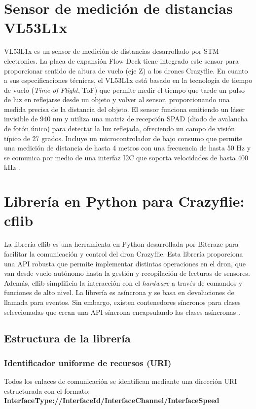 \section{Sensor de medición de distancias VL53L1x}
VL53L1x es un sensor de medición de distancias desarrollado por STM electronics. La placa de expansión Flow Deck tiene integrado este sensor para proporcionar sentido de altura de vuelo (eje Z) a los drones Crazyflie. En cuanto a sus especificaciones técnicas, el VL53L1x está basado en la tecnología de tiempo de vuelo (\textit{Time-of-Flight}, ToF) que permite medir el tiempo que tarde un pulso de luz en reflejarse desde un objeto y volver al sensor, proporcionando una medida precisa de la distancia del objeto. El sensor funciona emitiendo un láser invisible de 940 nm y utiliza una matriz de recepción SPAD (diodo de avalancha de fotón único) para detectar la luz reflejada, ofreciendo un campo de visión típico de 27 grados. Incluye un microcontrolador de bajo consumo que permite una medición de distancia de hasta 4 metros con una frecuencia de hasta 50 Hz y se comunica por medio de una interfaz I2C que soporta velocidades de hasta 400 kHz \cite{VL53L1x_datasheet}.

\newpage
\section{Librería en Python para Crazyflie: cflib}
La librería cflib es una herramienta en Python desarrollada por Bitcraze para facilitar la comunicación y control del dron Crazyflie. Esta librería proporciona una API robusta que permite implementar distintas operaciones en el dron, que van desde vuelo autónomo hasta la gestión y recopilación de lecturas de sensores. Además, cflib simplificia la interacción con el \textit{hardware} a través de comandos y funciones de alto nivel. La librería es asíncrona y se basa en devoluciones de llamada para eventos. Sin embargo, existen contenedores síncronos para clases seleccionadas que crean una API síncrona encapsulando las clases asíncronas \cite{Crazyflie_Python}.

\subsection{Estructura de la librería}
\subsubsection{Identificador uniforme de recursos (URI)}
Todos los enlaces de comunicación se identifican mediante una dirección URI estructurada con el formato: \textbf{InterfaceType://InterfaceId/InterfaceChannel/InterfaceSpeed}

